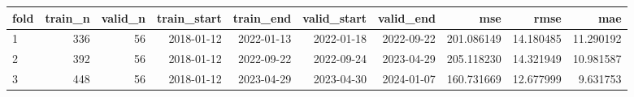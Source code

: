 \begin{tabular}{lrrrrrrrrr}
\toprule
fold & train\_n & valid\_n & train\_start & train\_end & valid\_start & valid\_end & mse & rmse & mae \\
\midrule
1 & 336 & 56 & 2018-01-12 & 2022-01-13 & 2022-01-18 & 2022-09-22 & 201.086149 & 14.180485 & 11.290192 \\
2 & 392 & 56 & 2018-01-12 & 2022-09-22 & 2022-09-24 & 2023-04-29 & 205.118230 & 14.321949 & 10.981587 \\
3 & 448 & 56 & 2018-01-12 & 2023-04-29 & 2023-04-30 & 2024-01-07 & 160.731669 & 12.677999 & 9.631753 \\
\bottomrule
\end{tabular}
